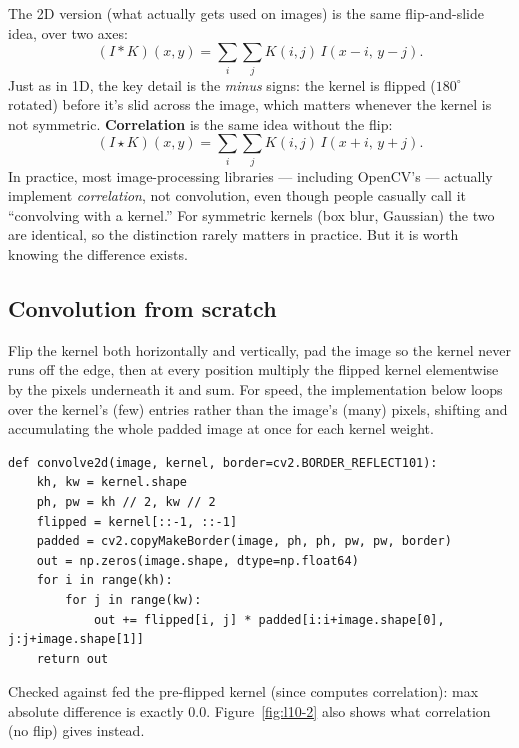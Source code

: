 The 2D version (what actually gets used on images) is the same flip-and-slide idea, over two axes:
\begin{equation}
(I * K)(x, y) = \sum_{i}\sum_{j} K(i, j)\, I(x - i,\, y - j).
\end{equation}
Just as in 1D, the key detail is the \emph{minus} signs: the kernel is flipped ($180^\circ$ rotated) before it's slid across the image, which matters whenever the kernel is not symmetric. \textbf{Correlation} is the same idea without the flip:
\begin{equation}
(I \star K)(x, y) = \sum_{i}\sum_{j} K(i, j)\, I(x + i,\, y + j).
\end{equation}
In practice, most image-processing libraries --- including OpenCV's  --- actually implement \emph{correlation}, not convolution, even though people casually call it ``convolving with a kernel.'' For symmetric kernels (box blur, Gaussian) the two are identical, so the distinction rarely matters in practice. But it is worth knowing the difference exists.

\subsection*{Convolution from scratch}

Flip the kernel both horizontally and vertically, pad the image so the kernel never runs off the edge, then at every position multiply the flipped kernel elementwise by the pixels underneath it and sum. For speed, the implementation below loops over the kernel's (few) entries rather than the image's (many) pixels, shifting and accumulating the whole padded image at once for each kernel weight.

\begin{lstlisting}
def convolve2d(image, kernel, border=cv2.BORDER_REFLECT101):
    kh, kw = kernel.shape
    ph, pw = kh // 2, kw // 2
    flipped = kernel[::-1, ::-1]
    padded = cv2.copyMakeBorder(image, ph, ph, pw, pw, border)
    out = np.zeros(image.shape, dtype=np.float64)
    for i in range(kh):
        for j in range(kw):
            out += flipped[i, j] * padded[i:i+image.shape[0], j:j+image.shape[1]]
    return out
\end{lstlisting}

Checked against  fed the pre-flipped kernel (since  computes correlation): max absolute difference is exactly $0.0$. Figure~\ref{fig:l10-2} also shows what correlation (no flip) gives instead.

